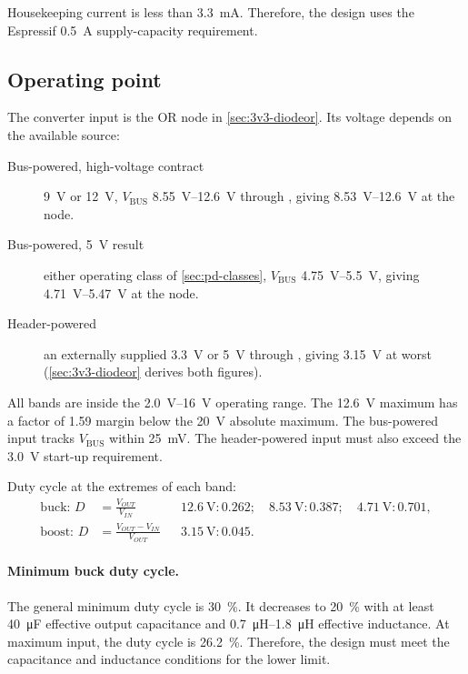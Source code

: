Housekeeping current is less than \SI{3.3}{\milli\ampere}. Therefore, the design
uses the Espressif \SI{0.5}{\ampere} supply-capacity requirement.

\subsection{Operating point}\label{sec:3v3-input}

The converter input is the OR node in \cref{sec:3v3-diodeor}. Its voltage
depends on the available source:
\begin{description}
  \item[Bus-powered, high-voltage contract] \SI{9}{\volt} or \SI{12}{\volt},
    $V_{\mathrm{BUS}}$ \SIrange{8.55}{12.6}{\volt} through , giving
    \SIrange{8.53}{12.6}{\volt} at the node.
  \item[Bus-powered, \SI{5}{\volt} result] either operating class of
    \cref{sec:pd-classes}, $V_{\mathrm{BUS}}$ \SIrange{4.75}{5.5}{\volt}, giving
    \SIrange{4.71}{5.47}{\volt} at the node.
  \item[Header-powered] an externally supplied \SI{3.3}{\volt} or \SI{5}{\volt}
    through , giving \SI{3.15}{\volt} at worst (\cref{sec:3v3-diodeor} derives
    both figures).
\end{description}
All bands are inside the \SIrange{2.0}{16}{\volt} operating range. The
\SI{12.6}{\volt} maximum has a factor of 1.59 margin below the
\SI{20}{\volt} absolute maximum. The bus-powered input tracks
$V_{\mathrm{BUS}}$ within \SI{25}{\milli\volt}. The header-powered input must
also exceed the \SI{3.0}{\volt} start-up requirement.

Duty cycle at the extremes of each band:
\begin{align*}
  \text{buck: } D &= \frac{V_{OUT}}{V_{IN}}
    &&\SI{12.6}{\volt}: 0.262; \quad \SI{8.53}{\volt}: 0.387; \quad
      \SI{4.71}{\volt}: 0.701, \\
  \text{boost: } D &= \frac{V_{OUT}-V_{IN}}{V_{OUT}}
    &&\SI{3.15}{\volt}: 0.045.
\end{align*}

\paragraph{Minimum buck duty cycle.} The general minimum duty cycle is
\SI{30}{\percent}. It decreases to \SI{20}{\percent} with at least
\SI{40}{\micro\farad} effective output capacitance and
\SIrange{0.7}{1.8}{\micro\henry} effective inductance. At maximum input, the
duty cycle is \SI{26.2}{\percent}. Therefore, the design must meet the
capacitance and inductance conditions for the lower limit.

